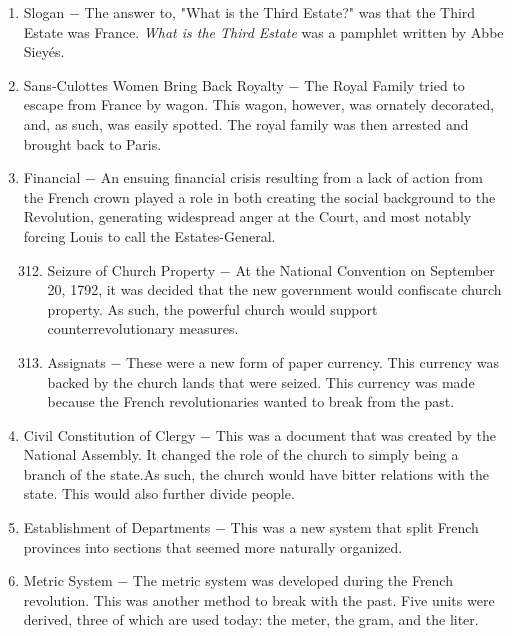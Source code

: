 \documentclass[12pt]{article}
\begin{document}
\begin{enumerate}
\item Slogan $-$ The answer to, "What is the Third Estate?" was that the Third Estate was France. \textit{What is the Third Estate} was a pamphlet written by Abbe Siey\'es.

\item Sans-Culottes Women Bring Back Royalty $-$ The Royal Family tried to escape from France by wagon. This wagon, however, was ornately decorated, and, as such, was easily spotted. The royal family was then arrested and brought back to Paris.

\item Financial $-$ An ensuing financial crisis resulting from a lack of action from the French crown played a role in both creating the social background to the Revolution, generating widespread anger at the Court, and most notably forcing Louis to call the Estates-General. 


\begin{enumerate}[label=\arabic{*}.]
\setcounter{enumii}{311}

\item Seizure of Church Property $-$ At the National Convention on September 20, 1792, it was decided that the new government would confiscate church property. As such, the powerful church would support counterrevolutionary measures.

\item Assignats $-$ These were a new form of paper currency. This currency was backed by the church lands that were seized. This currency was made because the French revolutionaries wanted to break from the past.

\end{enumerate}
\setcounter{enumi}{313}

\item Civil Constitution of Clergy $-$ This was a document that was created by the National Assembly. It changed the role of the church to simply being a branch of the state.As such, the church would have bitter relations with the state. This would also further divide people.

\item Establishment of Departments $-$ This was a new system that split French provinces into sections that seemed more naturally organized.

\item Metric System $-$ The metric system was developed during the French revolution. This was another method to break with the past. Five units were derived, three of which are used today: the meter, the gram, and the liter.  


\end{enumerate}
\end{document}
